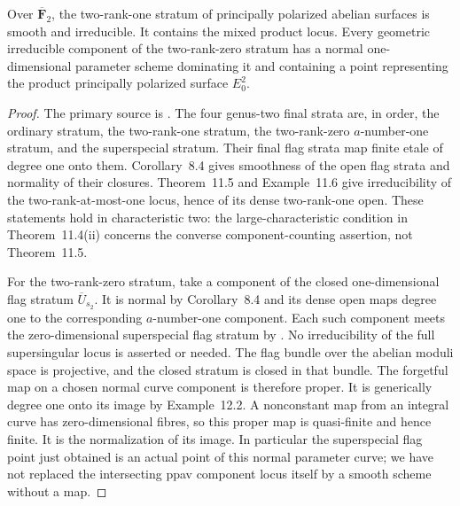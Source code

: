 \begin{lemma}
\label{lem:ppav-nonordinary-strata-candidate}
Over $\overline{\mathbf F}_2$, the two-rank-one stratum of
principally polarized abelian surfaces is smooth and
irreducible. It contains the mixed product locus.
Every geometric irreducible component of the two-rank-zero
stratum has a normal one-dimensional parameter scheme
dominating it and containing a point representing the
product principally polarized surface $E_0^2$.
\end{lemma}

\begin{proof}
The primary source is
\cite[Corollary~8.4, printed pp.~607--608; Theorem~11.5 and
Example~11.6, p.~620; Example~12.2, pp.~623--624]{EkedahlVanderGeer2009Strata}.
The four genus-two final strata are, in order, the ordinary
stratum, the two-rank-one stratum, the two-rank-zero
$a$-number-one stratum, and the superspecial stratum.
Their final flag strata map finite etale of degree one onto
them. Corollary~8.4 gives smoothness of the open flag strata
and normality of their closures. Theorem~11.5 and
Example~11.6 give irreducibility of the two-rank-at-most-one
locus, hence of its dense two-rank-one open. These statements
hold in characteristic two: the large-characteristic
condition in Theorem~11.4(ii) concerns the converse
component-counting assertion, not Theorem~11.5.

For the two-rank-zero stratum, take a component of the
closed one-dimensional flag stratum $\overline U_{s_2}$.
It is normal by Corollary~8.4 and its dense open maps
degree one to the corresponding $a$-number-one component.
Each such component meets the zero-dimensional superspecial
flag stratum by
\cite[Proposition~6.1 and its proof, printed p.~601]{EkedahlVanderGeer2009Strata}.
No irreducibility of the full supersingular locus is asserted
or needed. The flag bundle over the abelian moduli space is
projective, and the closed stratum is closed in that bundle.
The forgetful map on a chosen normal curve component is
therefore proper. It is generically degree one onto its
image by Example~12.2. A nonconstant map from an integral
curve has zero-dimensional fibres, so this proper map is
quasi-finite and hence finite. It is the normalization of
its image. In particular the superspecial flag point just
obtained is an actual point of this normal parameter curve;
we have not replaced the intersecting ppav component locus
itself by a smooth scheme without a map.


\end{proof}
